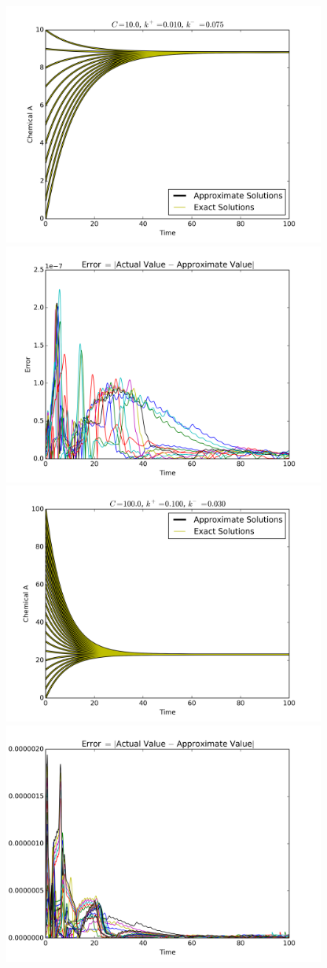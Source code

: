 \documentclass[12pt]{article}
\begin{document}
\begin{center}
	\includegraphics[width=400px]{figures/1_b_1_1.png}
	\includegraphics[width=400px]{figures/1_b_2_1.png}
	\includegraphics[width=400px]{figures/1_b_1_2.png}
	\includegraphics[width=400px]{figures/1_b_2_2.png}
\end{center}
\end{document}
